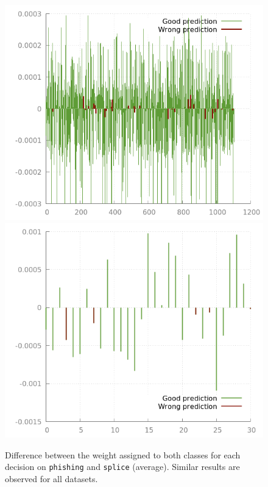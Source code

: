 \documentclass[preprint,12pt]{elsarticle}
\theoremstyle{definition}
\begin{document}
\begin{figure}[!h]
\centering
\includegraphics[scale=0.3]{img/output_run_0_diff_pred_1.png}
\includegraphics[scale=0.3]{img/output_run_2_diff_pred_1.png}
\caption{Difference between the weight assigned to both classes for each decision on \texttt{phishing} and \texttt{splice} (average). Similar results are observed for all datasets.}
\label{fig:phishing_predictive_measure}
\end{figure}
\end{document}
